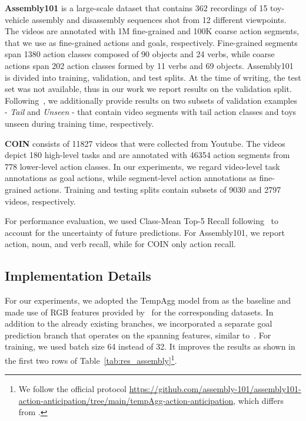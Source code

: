 \documentclass{article}
\begin{document}
\textbf{Assembly101} is a large-scale dataset that contains 362 recordings of 15 toy-vehicle assembly and disassembly sequences shot from 12 different viewpoints. The videos are annotated with 1M fine-grained and 100K coarse action segments, that we use as fine-grained actions and goals, respectively. Fine-grained segments span 1380 action classes composed of 90 objects and 24 verbs, while coarse actions span 202 action classes formed by 11 verbs and 69 objects. Assembly101 is divided into training, validation, and test splits. At the time of writing, the test set was not available, thus in our work we report results on the validation split. Following~\cite{sener2022assembly101}, we additionally provide results on two subsets of validation examples - \textit{Tail} and \textit{Unseen} - that contain video segments with tail action classes and toys unseen during training time, respectively.

\textbf{COIN} consists of 11827 videos that were collected from Youtube. The videos depict 180 high-level tasks and are annotated with 46354 action segments from 778 lower-level action classes. In our experiments, we regard video-level task annotations as goal actions, while segment-level action annotations as fine-grained actions. Training and testing splits contain subsets of 9030 and 2797 videos, respectively.

For performance evaluation, we used Class-Mean Top-5 Recall following~\cite{sener2022assembly101} to account for the uncertainty of future predictions. For Assembly101, we report action, noun, and verb recall, while for COIN only action recall.

\vspace{-0.25cm}
\subsection{Implementation Details}
\label{ssec:subhead}
\vspace{-0.1cm}
For our experiments, we adopted the TempAgg model from \cite{sener2022assembly101} as the baseline and made use of RGB features provided by~\cite{sener2022assembly101, tang2019coin} for the corresponding datasets. In addition to the already existing branches, we incorporated a separate goal prediction branch that operates on the spanning features, similar to~\cite{sener2020temporal}. For training, we used batch size 64 instead of 32. It improves the results as shown in the first two rows of Table~\ref{tab:res_assembly}\footnote{We follow the official protocol \url{https://github.com/assembly-101/assembly101-action-anticipation/tree/main/tempAgg-action-anticipation}, which differs from \cite{sener2022assembly101}.}. 
\end{document}
